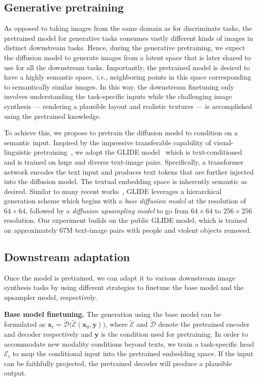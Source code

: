 \subsection{Generative pretraining}

As opposed to taking images from the same domain as for discriminate tasks, the pretrained model for generative tasks consumes vastly different kinds of images in distinct downstream tasks. Hence, during the generative pretraining, we expect the diffusion model to generate images from a latent space that is later shared to use for all the downstream tasks. Importantly, the pretrained model is desired to have a highly semantic space, \textit{i.e.}\@, neighboring points in this space corresponding to semantically similar images. In this way, the downstream finetuning only involves understanding the task-specific inputs while the challenging image synthesis --- rendering a plausible layout and realistic textures --- is accomplished using the pretrained knowledge.

To achieve this, we propose to pretrain the diffusion model to condition on a semantic input. Inspired by the impressive transferable capability of visual-linguistic pretraining~\cite{radford2021learning}, we adopt the GLIDE model~\cite{nichol2021glide} which is text-conditioned and is trained on huge and diverse text-image pairs. Specifically, a transformer network encodes the text input and produces text tokens that are further injected into the diffusion model. The textual embedding space is inherently semantic as desired. Similar to many recent works~\cite{ho2022cascaded,ramesh2022hierarchical}, GLIDE leverages a hierarchical generation scheme which begins with a \emph{base diffusion model} at the resolution of $64\times64$, followed by a \emph{diffusion upsampling model} to go from $64\times64$ to $256\times256$ resolution. Our experiment builds on the public GLIDE model, which is trained on approximately 67M text-image pairs with people and violent objects removed. 

\subsection{Downstream adaptation} Once the model is pretrained, we can adapt it to various downstream image synthesis tasks by using different strategies to finetune the base model and the upsampler model, respectively. 

\textbf{Base model finetuning.} The generation using the base model can be formulated as $\bm{x}_t = \tilde{\mathcal{D}}\big(\tilde{\mathcal{E}}(\bm{x}_0, {\bm{y}})\big)$, where $\tilde{\mathcal{E}}$ and $\tilde{\mathcal{D}}$ denote the pretrained encoder and decoder respectively and ${\bm{y}}$ is the condition used for pretraining. In order to accommodate new modality conditions beyond texts, we train a task-specific head $\mathcal{E}_i$ to map the conditional input into the pretrained embedding space. If the input can be faithfully projected, the pretrained decoder will produce a plausible output.   

